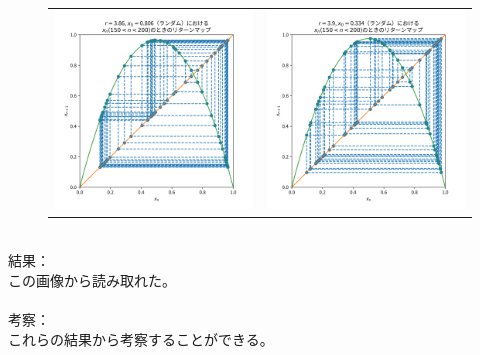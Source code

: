 \begin{figure}[htbp]
\begin{tabular}{cc}
    \begin{minipage}[t]{0.45\hsize}
      \centering
      \includegraphics[keepaspectratio, scale=0.3]{images/Problem3/report4_5.png}
    \end{minipage} &
    \begin{minipage}[t]{0.45\hsize}
      \centering
      \includegraphics[keepaspectratio, scale=0.3]{images/Problem3/report4_6.png}
    \end{minipage}
  \end{tabular}
\end{figure}
\\
結果：\\
この画像から読み取れた。\\\\
考察：\\
これらの結果から考察することができる。


